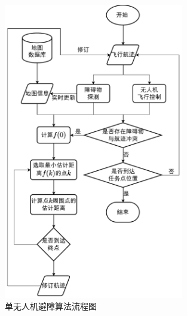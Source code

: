 \begin{figure}[!htbp]
    \centering
    \includegraphics[width=0.7\textwidth]{images/单无人机避障算法总流程图.pdf}
    \caption{单无人机避障算法流程图}
    \label{fig:单无人机避障算法流程图}
\end{figure}
